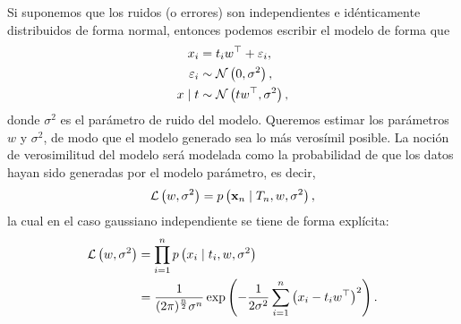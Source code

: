 Si suponemos que los ruidos (o errores) son independientes e idénticamente distribuidos de forma normal, entonces podemos escribir el modelo de forma que
\begin{align*}
	x_i				&= t_i w^{\top} + \varepsilon_i,\\
	\varepsilon_i	&\sim \mathcal{N} \left(0, \sigma^2\right),\\
	x \mid t		&\sim \mathcal{N} \left(t w^{\top}, \sigma^2\right),
\end{align*}
donde \(\sigma^2\) es el parámetro de ruido del modelo. Queremos estimar los parámetros \(w\) y \(\sigma^2\), de modo que el modelo generado sea lo más verosímil posible. La noción de verosimilitud del modelo será modelada como la probabilidad de que los datos hayan sido generadas por el modelo parámetro, es decir,
\begin{equation*}
	\mathcal{L} \left(w, \sigma^2\right) = p\left(\mathbf{x}_n \mid T_n, w, \sigma^2\right),
\end{equation*}
la cual en el caso gaussiano independiente se tiene de forma explícita:
\begin{align*}
	\mathcal{L} \left(w, \sigma^2\right)	&= \prod_{i=1}^n p\left(x_i \mid t_i, w, \sigma^2\right)\\
									&= \frac{1}{(2\pi)^{\frac{n}{2}} \sigma^n} \exp \left(-\frac{1}{2\sigma^2} \sum_{i=1}^n \left(x_i - t_i w^{\top}\right)^2\right).
\end{align*}

